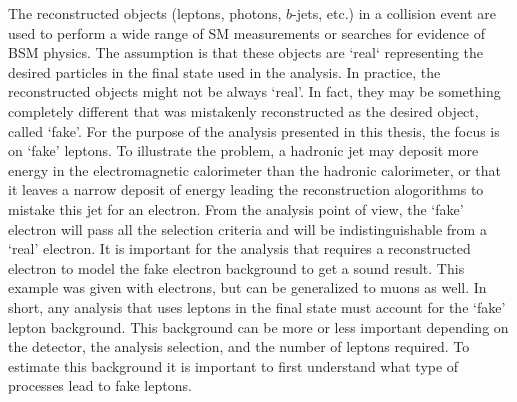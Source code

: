 The reconstructed objects (leptons, photons, $b$-jets, etc.) in a collision event are used to perform a wide range of SM measurements 
or searches for evidence of BSM physics. The assumption is that these objects are `real` representing the desired particles 
in the final state used in the analysis. 
In practice, the reconstructed objects might not be always `real'. In fact, they may be something completely different that
was mistakenly reconstructed as the desired object, called `fake'. 
For the purpose of the analysis presented in this thesis, the focus is on `fake' leptons. 
To illustrate the problem, a hadronic jet may deposit more energy in the electromagnetic calorimeter than the hadronic calorimeter, 
or that it leaves a narrow deposit of energy leading the reconstruction alogorithms to mistake this jet for an electron.
From the analysis point of view, the `fake' electron will pass all the selection criteria and will be indistinguishable from 
a `real' electron. 
It is important for the analysis that requires a reconstructed electron to model the fake electron background to get a sound 
result. This example was given with electrons, but can be generalized to muons as well. 
In short, any analysis that uses leptons in the final state must account for the `fake' lepton background. 
This background can be more or less important depending on the detector, the analysis selection, and the number of leptons required. 
To estimate this background it is important to first understand what type of processes lead to fake leptons.
